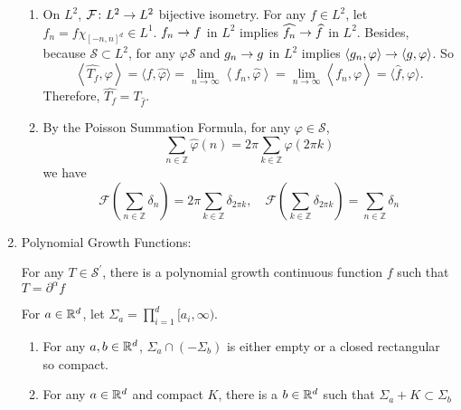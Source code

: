 \begin{enumerate}
\begin{exam}
\begin{enumerate}
			\item On $L^2$, $\mathcal{F} \colon L^2 \rightarrow L^2$ bijective isometry. For any $f \in L^2$, let $f_n = f\chi_{[-n,n]^d} \in L^1$. $f_n \rightarrow f$ in $L^2$ implies $\widehat{f_n} \rightarrow \widehat{f}$ in $L^2$. Besides, because $\mathcal{S} \subset L^2$, for any $\varphi \mathcal{S}$ and $g_n \rightarrow g$ in $L^2$ implies $\langle g_n ,\varphi \rangle \rightarrow \langle g, \varphi \rangle$. So
			\begin{equation*}
				\left\langle\widehat{T_f}, \varphi\right\rangle=\langle f, \widehat{\varphi}\rangle=\lim _{n \rightarrow \infty}\left\langle f_n, \widehat{\varphi}\right\rangle=\lim _{n \rightarrow \infty}\left\langle\widehat{f_n}, \varphi\right\rangle=\langle \widehat{f}, \varphi\rangle .
			\end{equation*}
			Therefore, $\widehat{T_f} = T_{\widehat{f}}$.

			\item By the Poisson Summation Formula, for any $\varphi \in \mathcal{S}$,
			\begin{equation*}
				\sum_{n \in \mathbb{Z}} \widehat{\varphi}(n)=2 \pi \sum_{k \in \mathbb{Z}} \varphi(2 \pi k)
			\end{equation*}
			we have
			\begin{equation*}
				\mathcal{F}\left(\sum_{n \in \mathbb{Z}} \delta_n\right)=2 \pi \sum_{k \in \mathbb{Z}} \delta_{2 \pi k}, \quad \mathcal{F}\left(\sum_{k \in \mathbb{Z}} \delta_{2 \pi k}\right)=\sum_{n \in \mathbb{Z}} \delta_n
			\end{equation*}
		\end{enumerate}
	\end{exam}

	\item Polynomial Growth Functions:
	\begin{thm}
		For any $T \in \mathcal{S}^\prime$, there is a polynomial growth continuous function $f$ such that $T = \partial^\alpha f$
	\end{thm}

	\noindent For $a \in \mathbb{R}^d$, let $\Sigma_a = \prod_{i=1}^d[a_i,\infty)$.
	\begin{prop}
		\begin{enumerate}
			\item For any $a,b \in \mathbb{R}^d$, $\Sigma_a \cap\left(-\Sigma_b\right)$ is either empty or a closed rectangular so compact.

			\item For any $a \in \mathbb{R}^d$ and compact $K$, there is a $b \in \mathbb{R}^d$ such that $\Sigma_a + K \subset \Sigma_b$
		\end{enumerate}
	\end{prop}


\end{enumerate}

